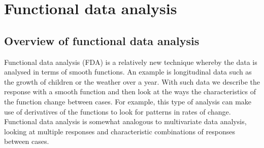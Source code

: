 


\section{Functional data analysis}
\subsection{Overview of functional data analysis}
Functional data analysis (FDA) is a relatively new technique whereby the data is analysed in terms of smooth functions. An example is longitudinal data such as the growth of children or the weather over a year\cite{ramsay}. With such data we describe the response with a smooth function and then look at the ways the characteristics of the function change between cases. For example, this type of analysis can make use of derivatives of the functions to look for patterns in rates of change. Functional data analysis is somewhat analogous to multivariate data analysis, looking at multiple responses and characteristic combinations of responses between cases.

